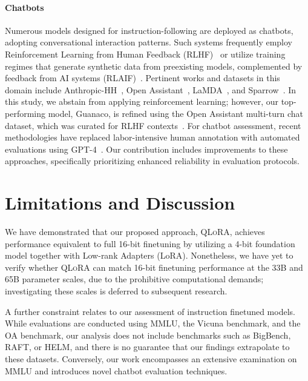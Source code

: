 \paragraph{Chatbots} Numerous models designed for instruction-following are deployed as chatbots, adopting conversational interaction patterns. Such systems frequently employ Reinforcement Learning from Human Feedback (RLHF)~\citep{christiano2017deep} or utilize training regimes that generate synthetic data from preexisting models, complemented by feedback from AI systems (RLAIF)~\citep{bai2022constitutional}. Pertinent works and datasets in this domain include Anthropic-HH~\citep{askell2021general,bai2022training}, Open Assistant~\citep{kopf2023openassistant}, LaMDA~\citep{thoppilan2022lamda}, and Sparrow~\citep{glaese2022improving}. In this study, we abstain from applying reinforcement learning; however, our top-performing model, Guanaco, is refined using the Open Assistant multi-turn chat dataset, which was curated for RLHF contexts~\citep{kopf2023openassistant}. For chatbot assessment, recent methodologies have replaced labor-intensive human annotation with automated evaluations using GPT-4~\citep{vicuna2023,peng2023instruction}. Our contribution includes improvements to these approaches, specifically prioritizing enhanced reliability in evaluation protocols.

\section{Limitations and Discussion}

We have demonstrated that our proposed approach, \textsc{QLoRA}, achieves performance equivalent to full 16-bit finetuning by utilizing a 4-bit foundation model together with Low-rank Adapters (LoRA). Nonetheless, we have yet to verify whether \textsc{QLoRA} can match 16-bit finetuning performance at the 33B and 65B parameter scales, due to the prohibitive computational demands; investigating these scales is deferred to subsequent research.

A further constraint relates to our assessment of instruction finetuned models. While evaluations are conducted using MMLU, the Vicuna benchmark, and the OA benchmark, our analysis does not include benchmarks such as BigBench, RAFT, or HELM, and there is no guarantee that our findings extrapolate to these datasets. Conversely, our work encompasses an extensive examination on MMLU and introduces novel chatbot evaluation techniques.

